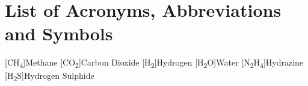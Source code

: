 \chapter*{List of Acronyms, Abbreviations and Symbols}
\begin{acronym}

\end{acronym} 

\begin{acronym}
    [CH\textsubscript{4}]{Methane}
    [CO\textsubscript{2}]{Carbon Dioxide}
    [H\textsubscript{2}]{Hydrogen}
    [H\textsubscript{2}O]{Water}
    [N\textsubscript{2}H\textsubscript{4}]{Hydrazine}
    [H\textsubscript{2}S]{Hydrogen Sulphide}
\end{acronym}